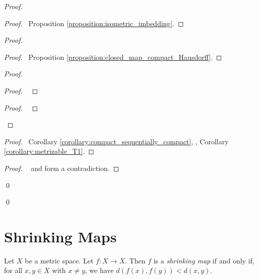 \begin{proof}
    \pf
    \begin{proof}
        \pf\ Proposition \ref{proposition:isometric_imbedding}.
    \end{proof}
    \begin{proof}
        \begin{proof}
            \pf\ Proposition \ref{proposition:closed_map_compact_Hausdorff}.
        \end{proof}
        \begin{proof}
            \begin{proof}
                \pf\ 
            \end{proof}
            \begin{proof}
                \pf\ 
            \end{proof}
        \end{proof}
        \begin{proof}
            \pf\ Corollary \ref{corollary:compact_sequentially_compact},
            , Corollary \ref{corollary:metrizable_T1}.
        \end{proof}
        \qedstep
        \begin{proof}
            \pf\  and  form a contradiction.
        \end{proof}
        \qed
    \end{proof}
    \qed
\end{proof}

\section{Shrinking Maps}

\begin{definition}
    Let $X$ be a metric space. Let $f : X \rightarrow X$. Then $f$ is a
    \emph{shrinking map} if and only if, for all $x, y \in X$ with $x \neq y$,
    we have $d(f(x),f(y)) < d(x,y)$.
\end{definition}

